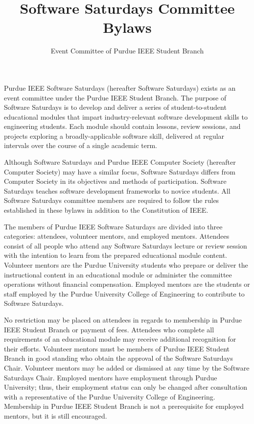 \documentclass[12pt]{constitution}
\title{Software Saturdays Committee Bylaws}
\author{Event Committee of Purdue IEEE Student Branch}
\date{}
\begin{document}

\titlecontentspage
\newpage


\label{art:namepurp}

Purdue IEEE Software Saturdays (hereafter Software Saturdays) exists as an event committee under the Purdue IEEE Student Branch. The purpose of Software Saturdays is to develop and deliver a series of student-to-student educational modules that impart industry-relevant software development skills to engineering students. Each module should contain lessons, review sessions, and projects exploring a broadly-applicable software skill, delivered at regular intervals over the course of a single academic term.

Although Software Saturdays and Purdue IEEE Computer Society (hereafter Computer Society) may have a similar focus, Software Saturdays differs from Computer Society in its objectives and methods of participation. Software Saturdays teaches software development frameworks to novice students. All Software Saturdays committee members are required to follow the rules established in these bylaws in addition to the Constitution of IEEE.

\label{art:member}

The members of Purdue IEEE Software Saturdays are divided into three categories: attendees, volunteer mentors, and employed mentors. Attendees consist of all people who attend any Software Saturdays lecture or review session with the intention to learn from the prepared educational module content. Volunteer mentors are the Purdue University students who prepare or deliver the instructional content in an educational module or administer the committee operations without financial compensation. Employed mentors are the students or staff employed by the Purdue University College of Engineering to contribute to Software Saturdays.

No restriction may be placed on attendees in regards to membership in Purdue IEEE Student Branch or payment of fees. Attendees who complete all requirements of an educational module may receive additional recognition for their efforts. Volunteer mentors must be members of Purdue IEEE Student Branch in good standing who obtain the approval of the Software Saturdays Chair. Volunteer mentors may be added or dismissed at any time by the Software Saturdays Chair. Employed mentors have employment through Purdue University; thus, their employment status can only be changed after consultation with a representative of the Purdue University College of Engineering. Membership in Purdue IEEE Student Branch is not a prerequisite for employed mentors, but it is still encouraged.
\end{document}
